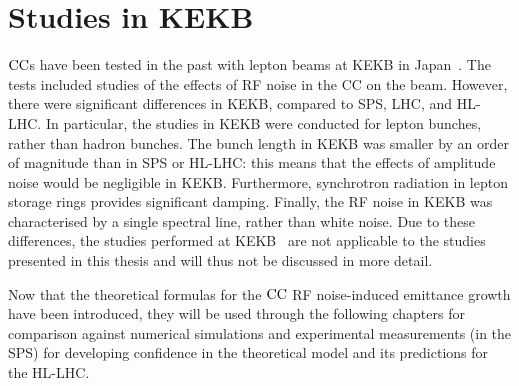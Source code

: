 
\section{Studies in KEKB}\label{eq:past_studies_KEKB}
${\mathrm{CC}}$s have been tested in the past with lepton beams at KEKB in Japan~\cite{CC_KEKB_4440798, Funakoshi:1955812, oide:pac07-mozaki01}. %
The tests included studies of the effects of RF noise in the CC on the beam. However, there were significant differences in KEKB, compared to SPS, LHC, and HL-LHC. In particular, the studies in KEKB were conducted for lepton bunches, rather than hadron bunches.  The bunch length in KEKB was smaller by an order of magnitude than in SPS or HL-LHC: this means that the effects of amplitude noise would be negligible in KEKB.  Furthermore, synchrotron radiation in lepton storage rings provides significant damping.  Finally, the RF noise in KEKB was characterised by a single spectral line, rather than white noise. Due to these differences, the studies performed at KEKB~\cite{PhysRevSTAB.14.111003} are not applicable to the studies presented in this thesis and will thus not be discussed in more detail.



Now that the theoretical formulas for the ${\mathrm{CC}}$ RF noise-induced emittance growth have been introduced, they will be used through the following chapters for comparison against numerical simulations and experimental measurements (in the SPS) for developing confidence in the theoretical model and its predictions for the HL-LHC.
